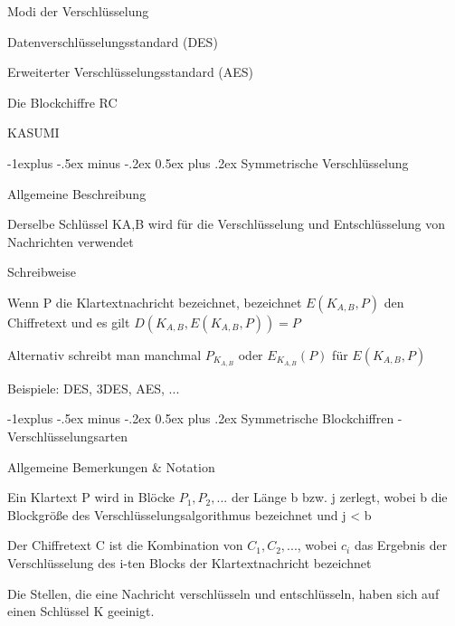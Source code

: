 \documentclass[a4paper]{article}
\makeatletter
\renewcommand{\subsection}{\@startsection{subsection}{2}{0mm}%
 {-1explus -.5ex minus -.2ex}%
 {0.5ex plus .2ex}%
 {\normalfont\normalsize\bfseries}}
\makeatother
\begin{document}
\begin{multicols}{3}
      \begin{itemize*}
            \item Modi der Verschlüsselung
            \item Datenverschlüsselungsstandard (DES)
            \item Erweiterter Verschlüsselungsstandard (AES)
            \item Die Blockchiffre RC
            \item KASUMI
      \end{itemize*}


      \subsection{Symmetrische
            Verschlüsselung}

      \begin{itemize*}
            \item Allgemeine Beschreibung
            \begin{itemize*}
                  \item Derselbe Schlüssel KA,B wird für die Verschlüsselung und Entschlüsselung von Nachrichten verwendet
            \end{itemize*}
            \item Schreibweise
            \begin{itemize*}
                  \item Wenn P die Klartextnachricht bezeichnet, bezeichnet $E(K_{A,B}, P)$ den Chiffretext und es gilt $D(K_{A,B}, E(K_{A,B}, P)) = P$
                  \item Alternativ schreibt man manchmal $P_{K_{A,B}}$ oder $E_{K_{A,B}}(P)$ für $E(K_{A,B}, P)$
            \end{itemize*}
            \item Beispiele: DES, 3DES, AES, ...
      \end{itemize*}


      \subsection{Symmetrische Blockchiffren -
            Verschlüsselungsarten}

      Allgemeine Bemerkungen \& Notation

      \begin{itemize*}
            \item Ein Klartext P wird in Blöcke $P_1, P_2, ...$ der Länge b bzw. j
            zerlegt, wobei b die Blockgröße des Verschlüsselungsalgorithmus
            bezeichnet und j < b
            \item Der Chiffretext C ist die Kombination von $C_1, C_2, ...$, wobei
            $c_i$ das Ergebnis der Verschlüsselung des i-ten Blocks der
            Klartextnachricht bezeichnet
            \item Die Stellen, die eine Nachricht verschlüsseln und entschlüsseln, haben
            sich auf einen Schlüssel K geeinigt.
      \end{itemize*}


\end{multicols}
\end{document}
